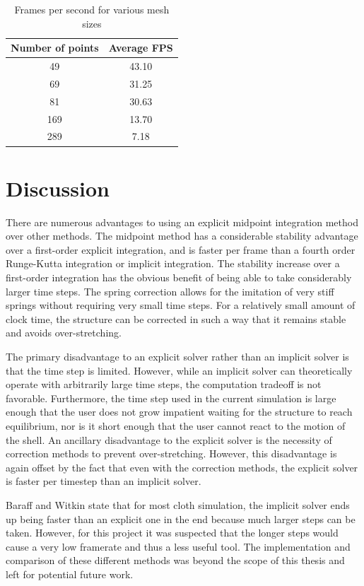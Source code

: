 \documentclass{thesis}
\begin{document}
\begin{table}
\begin{center}
  \begin{tabular}{ | c | c | }
    \hline
    Number of points & Average FPS \\ \hline
	49 & 43.10 \\ \hline
	69 & 31.25 \\ \hline
    81 & 30.63 \\ \hline
	169 & 13.70 \\ \hline
    289 & 7.18 \\ \hline
  \end{tabular}
  \caption{Frames per second for various mesh sizes}
\end{center}
\end{table}

\section{Discussion}
There are numerous advantages to using an explicit midpoint integration method over other methods.  The midpoint method has a
considerable stability advantage over a first-order explicit integration, and is faster per frame than a fourth order Runge-Kutta
integration or implicit integration.  The stability increase over a first-order integration has the obvious benefit of being able to
take considerably larger time steps.  The spring correction allows for the imitation of very stiff springs without requiring very
small time steps.  For a relatively small amount of clock time, the structure can be corrected in such a way that it remains stable
and avoids over-stretching.

The primary disadvantage to an explicit solver rather than an implicit solver is that the time step is limited.  However, while an
implicit solver can theoretically operate with arbitrarily large time steps, the computation tradeoff is not favorable.  Furthermore,
the time step used in the current simulation is large enough that the user does not grow impatient waiting for the structure to reach
equilibrium, nor is it short enough that the user cannot react to the motion of the shell.  An ancillary disadvantage to the
explicit solver is the necessity of correction methods to prevent over-stretching.  However, this disadvantage is again offset by the
fact that even with the correction methods, the explicit solver is faster per timestep than an implicit solver.

Baraff and Witkin\cite{baraff98largesteps} state that for most cloth simulation, the implicit solver ends up being faster than an
explicit one in the end because much larger steps can be taken.  However, for this project it was suspected that the longer steps
would cause a very low framerate and thus a less useful tool.  The implementation and comparison of these different methods was
beyond the scope of this thesis and left for potential future work.
\end{document}
